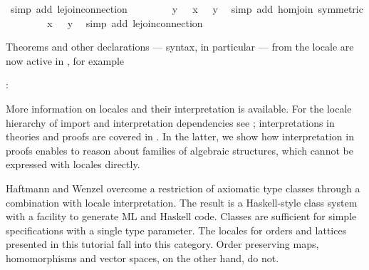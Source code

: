 \begin{isabellebody}
\ {\isacharparenleft}simp\ add{\isacharcolon}\ le{\isachardot}join{\isacharunderscore}connection{\isacharparenright}\isanewline
\ \ \ \ \isamarkupfalse%
\ \isamarkupfalse%
\ {\isachardoublequoteopen}{\isasymphi}\ y\ {\isacharequal}\ {\isacharparenleft}{\isasymphi}\ x\ {\isasymsqunion}{\isacharprime}\ {\isasymphi}\ y{\isacharparenright}{\isachardoublequoteclose}\ \isamarkupfalse%
\ {\isacharparenleft}simp\ add{\isacharcolon}\ hom{\isacharunderscore}join\ {\isacharbrackleft}symmetric{\isacharbrackright}{\isacharparenright}\isanewline
\ \ \ \ \isamarkupfalse%
\ \isamarkupfalse%
\ {\isachardoublequoteopen}{\isasymphi}\ x\ {\isasympreceq}\ {\isasymphi}\ y{\isachardoublequoteclose}\ \isamarkupfalse%
\ {\isacharparenleft}simp\ add{\isacharcolon}\ le{\isacharprime}{\isachardot}join{\isacharunderscore}connection{\isacharparenright}\isanewline
\ \ \isamarkupfalse%
%
\endisatagproof
{\isafoldproof}%
%
\isadelimproof
%
\endisadelimproof
%
\begin{isamarkuptext}%
Theorems and other declarations --- syntax, in particular --- from
  the locale  are now active in , for example

  :
\end{isamarkuptext}%
\isamarkuptrue%
%
\isamarkuptrue%
%
\begin{isamarkuptext}%
More information on locales and their interpretation is
  available.  For the locale hierarchy of import and interpretation
  dependencies see \cite{Ballarin2006a}; interpretations in theories
  and proofs are covered in \cite{Ballarin2006b}.  In the latter, we
  show how interpretation in proofs enables to reason about families
  of algebraic structures, which cannot be expressed with locales
  directly.

  Haftmann and Wenzel \cite{HaftmannWenzel2007} overcome a restriction
  of axiomatic type classes through a combination with locale
  interpretation.  The result is a Haskell-style class system with a
  facility to generate ML and Haskell code.  Classes are sufficient for
  simple specifications with a single type parameter.  The locales for
  orders and lattices presented in this tutorial fall into this
  category.  Order preserving maps, homomorphisms and vector spaces,
  on the other hand, do not.


\end{isamarkuptext}
\end{isabellebody}
